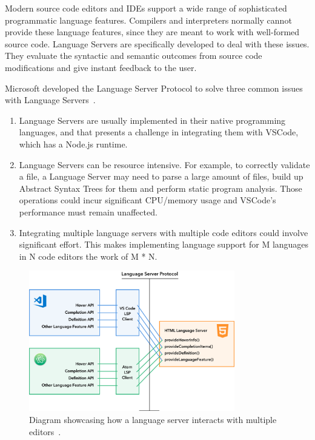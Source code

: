 Modern source code editors and IDEs support a wide range of sophisticated programmatic language features. Compilers and interpreters normally cannot provide these language features, since they are meant to work with well-formed source code. Language Servers are specifically developed to deal with these issues. They evaluate the syntactic and semantic outcomes from source code modifications and give instant feedback to the user.

Microsoft developed the Language Server Protocol to solve three common issues with Language Servers~\parencite{lsp_guide}.

\begin{enumerate}
    \item Language Servers are usually implemented in their native programming languages, and that presents a challenge in integrating them with VSCode, which has a Node.js runtime.

    \item Language Servers can be resource intensive. For example, to correctly validate a file, a Language Server may need to parse a large amount of files, build up Abstract Syntax Trees for them and perform static program analysis. Those operations could incur significant CPU/memory usage and VSCode's performance must remain unaffected.

    \item Integrating multiple language servers with multiple code editors could involve significant effort. This makes implementing language support for M languages in N code editors the work of M * N.
\end{enumerate}

\begin{figure}[ht]
    \centering
    \includegraphics[width=0.8\textwidth]{figures/background/multi-editor.png}
    \caption{Diagram showcasing how a language server interacts with multiple editors~\parencite{extensions_overview}.}
    \label{fig:lsp_example}
\end{figure}

